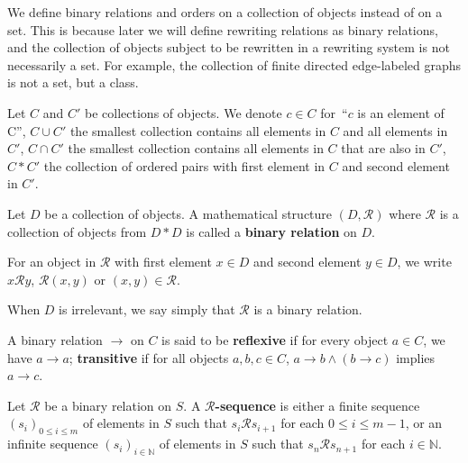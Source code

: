 We define binary relations and orders on a collection of objects instead of on a set. This is because later we will define rewriting relations as binary relations, and the collection of objects subject to be rewritten in a rewriting system is not necessarily a set. For example, the collection of finite directed edge-labeled graphs is not a set, but a class.

\begin{notation}
    Let $C$ and $C'$ be collections of objects. We denote $c \in C$ for~\enquote{$c$ is an element of C}, $C \cup C'$ the smallest collection contains all elements in $C$ and all elements in $C'$, $C \cap C'$ the smallest collection contains all elements in $C$ that are also in $C'$, $C * C'$ the collection of ordered pairs with first element in $C$ and second element in $C'$.  
  \end{notation} 
  
  \begin{definition}
    \label{def:binary_relation:binary_relation}
    Let $D$ be a collection of objects. A mathematical structure \( (D, \mathcal{R}) \) where $\mathcal{R}$ is a collection of objects from $D * D$ is called a \textbf{binary relation} on $D$. 
    
    For an object in $\mathcal{R}$ with first element $x \in D$ and second element $y\in D$, we write $x \mathcal{R} y$, $\mathcal{R}(x,y)$ or $(x,y) \in \mathcal{R}$. 
    
    When $D$ is irrelevant, we say simply that $\mathcal{R}$ is a binary relation.
  \end{definition} 
   
  \begin{definition}
    \label{def:binary_relation:reflexivity_transitivity}
    A binary relation \( \to \) on \(C\) is said to be \textbf{reflexive} if for every object \(a \in C\), we have \(a \to a\); \textbf{transitive} if for all objects \( a, b, c \in C\), \( a \to b \land (b \to c) \) implies \(a \to c\).
  \end{definition}
  
  \begin{definition}
    \label{def:binary_relation:sequence}
    Let \(\mathcal{R}\) be a binary relation on $S$.
    A \textbf{\( \mathcal{R} \)-sequence} is either a finite sequence \( \left( s_i \right)_{0 \leq i \leq m} \) of elements in $S$ such that \(s_i \mathcal{R} s_{i+1}\) for each \( 0 \leq i \leq m-1\), or an infinite sequence \((s_i)_{i \in \mathbb{N}}\) of elements in $S$ such that \(s_n \mathcal{R} s_{n+1}\) for each \(i \in \mathbb{N}\).
\end{definition}

